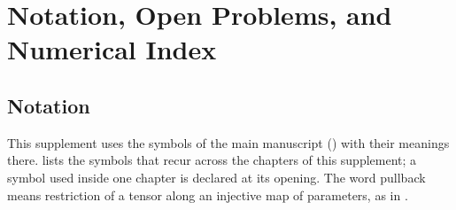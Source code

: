 \chapter{Notation, Open Problems, and Numerical Index}
\label{app:gaussian-backmatter}

\section{Notation}

This supplement uses the symbols of the main manuscript () with their meanings
there.  lists the symbols that recur across the chapters of this
supplement; a symbol used inside one chapter is declared at its opening. The word pullback means
restriction of a tensor along an injective map of parameters, as in
.

